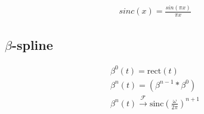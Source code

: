 \documentclass[a4paper]{amsart}
\begin{document}
\begin{comment}
	\begin{itemize}
		\item Après la division euclidienne on trouve
		\begin{eqnarray*}
			H(X)=\overbrace{1}^{R(X)}+\frac{\overbrace{3X-1}^{S(X)}}{\underbrace{(X-1)^2(X+2)}_{Q(X)}}
		\end{eqnarray*}
	\item On pose
	\begin{eqnarray*}
		\frac{3X-1}{(X-1)^2(X+2)}=\frac{A}{(X-1)^2}+\frac{B}{(X-1)}+\frac{C}{(X+2)}
		&\Bigg| \cdot (X-1)^2(X+2)\\
		\Rightarrow\\
		3X-1=A(X+2)+B(X-1)(X+2)+C(X-1)^2
	\end{eqnarray*}
	\item Après résolution on trouve
	\begin{eqnarray*}
		\begin{cases}
			A=\frac{2}{3}
			\\
			B=\frac{7}{9}\\
			C=-\frac{7}{9}
		\end{cases}
	\end{eqnarray*}
	et donc
	\begin{eqnarray*}
		H(X)=\frac{X^3+1}{(X-1)^2(X+2)}=1+\frac{2}{3}\frac{1}{(X-1)^2}+\frac{7}{9}\frac{1}{(X-1)}-\frac{7}{9}\frac{1}{(X+2)}
	\end{eqnarray*}
	\end{itemize}
	Si $H$ était une réponse impulsionelle dans le domaine fréquentiel, on peut trouver la réponse dans le domaine temporel en appliquant la transformée de Fourier inverse.
	\begin{eqnarray*}
		h(t)=
		\mathcal F^{-1}\{H(j\omega)\}(t)=
		\delta(t)
		+u(t)\left[\frac{7}{9}e^{t}-\frac{7}{9}e^{-2t}+\frac{2}{3}\frac{t}{2}e^{t}\right].
	\end{eqnarray*}
\end{myExample}
\end{comment}
\begin{eqnarray}
	sinc(x)=\frac{sin(\pi x)}{\pi x}
\end{eqnarray}

\subsection{$\beta$-spline}
\begin{eqnarray}
	\beta^0(t)=\mathrm{rect}(t)\\
	\beta^n(t)=(\beta^{n-1}*\beta^0)\\
	\beta^n(t)\xrightarrow{\mathcal{F}}\mathrm{sinc}(\frac{\omega}{2\pi})^{n+1}
\end{eqnarray}
\end{document}
